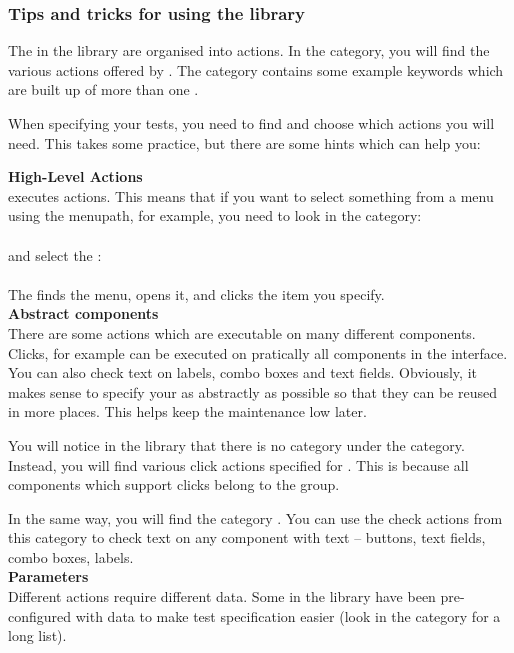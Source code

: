 \subsubsection{Tips and tricks for using the \gdcase{} library}
\label{UnderstandingLibrary}
The \gdcases{} in the library are organised into actions. In the  category, you will find the various actions offered by \gd{}. The  category contains some example keywords which are built up of more than one \gdcase{}. 

When specifying your tests, you need to find and choose which actions you will need. This takes some practice, but there are some hints which can help you:

\textbf{High-Level Actions}\\
\gd{} executes  actions. This means that if you want to select something from a menu using the menupath, for example, you need to look in the category:\\
\\
and select the \gdcase{}:\\
\\
The \gdcase{} finds the menu, opens it, and clicks the item you specify. \\

\textbf{Abstract components}\\
There are some actions which are executable on many different components. Clicks, for example can be executed on pratically all components in the interface. You can also check text on labels, combo boxes and text fields. Obviously, it makes sense to specify your \gdcases{} as abstractly as possible so that they can be reused in more places. This helps keep the maintenance low later. 

You will notice in the library that there is no  category under the  category. Instead, you will find various click actions specified for . This is because all components which support clicks belong to the  group. 

In the same way, you will find the category . You can use the check actions from this category to check text on any component with text -- buttons, text fields, combo boxes, labels. \\

\textbf{Parameters}\\
Different actions require different data. Some \gdcases{} in the library have been pre-configured with data to make test specification easier (look in the category  for a long list). 

